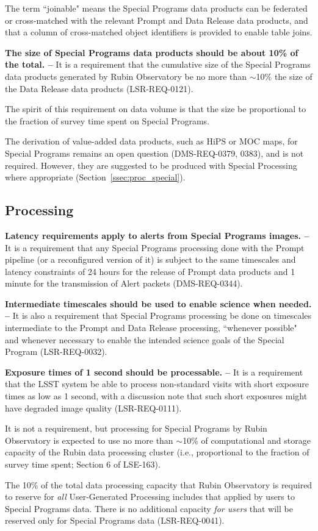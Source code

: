 The term ``joinable" means the Special Programs data products can be federated 
or cross-matched with the relevant Prompt and Data Release data products, and that
a column of cross-matched object identifiers is provided to enable table joins.

\textbf{The size of Special Programs data products should be about 10\% of the total. --}
It is a requirement that the cumulative size of the Special Programs data 
products generated by Rubin Observatory be no more than $\sim$10\% the 
size of the Data Release data products (LSR-REQ-0121).

The spirit of this requirement on data volume is that the size be proportional to the fraction 
of survey time spent on Special Programs.

The derivation of value-added data products, such as HiPS or MOC maps, for 
Special Programs remains an open question (DMS-REQ-0379, 0383), and is not required.
However, they are suggested to be produced with Special Processing where
appropriate (Section~\ref{ssec:proc_special}).

\subsection{Processing}\label{ssec:req_proc}

\textbf{Latency requirements apply to alerts from Special Programs images. --}
It is a requirement that any Special Programs processing done with the 
Prompt pipeline (or a reconfigured version of it) is subject to the same 
timescales and latency constraints of 24 hours for the release of Prompt 
data products and 1 minute for the transmission of Alert packets 
(DMS-REQ-0344).

\textbf{Intermediate timescales should be used to enable science when needed. --}
It is also a requirement that Special Programs processing be done on 
timescales intermediate to the Prompt and Data Release processing, 
``whenever possible" and whenever necessary to enable the intended science 
goals of the Special Program (LSR-REQ-0032).

\textbf{Exposure times of 1 second should be processable. -- }
It is a requirement that the LSST system be able to process non-standard 
visits with short exposure times as low as 1 second, with a discussion 
note that such short exposures might have degraded image quality 
(LSR-REQ-0111).

It is not a requirement, but processing for Special Programs by Rubin Observatory is expected to use no 
more than $\sim$10\% of computational and storage capacity of the Rubin data processing cluster 
(i.e., proportional to the fraction of survey time spent; Section 6 of LSE-163).

The 10\% of the total data processing capacity that Rubin Observatory is 
required to reserve for \emph{all} User-Generated Processing includes that 
applied by users to Special Programs data.
There is no additional capacity {\it for users} that will be reserved only for Special 
Programs data (LSR-REQ-0041).
